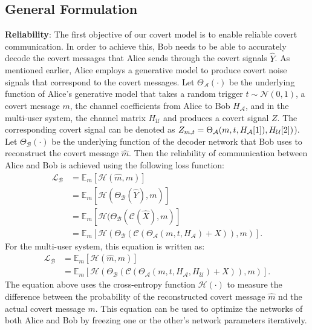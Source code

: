 \subsection{General Formulation}
\textbf{Reliability}: The first objective of our covert model is to enable reliable covert communication. In order to achieve this, Bob needs to be able to accurately decode the covert messages that Alice sends through the covert signals \(\hat{Y}\). As mentioned earlier, Alice employs a generative model to produce covert noise signals that correspond to the covert messages. Let \(\Theta_{\mathcal{A}}(\cdot)\) be the underlying function of Alice's generative model that takes a random trigger \(t \sim \mathcal{N}(0, 1)\), a covert message \(m\), the channel coefficients from Alice to Bob \(H_{\mathcal{A}}\), and in the multi-user system, the channel matrix \(H_{\mathcal{U}}\) and produces a covert signal \(Z\). The corresponding covert signal can be denoted as \(Z_{m, t} = \Theta_{\mathcal{A}}(m, t, H_{\mathcal{A}}[1]), H_{\mathcal{U}}[2])\)). Let  \(\Theta_{\mathcal{B}}(\cdot)\) be the underlying function of the decoder network that Bob uses to reconstruct the covert message \(\hat{m}\). Then the reliability of communication between Alice and Bob is achieved using the following loss function:
\begin{equation}
	\begin{aligned} \label{bob_loss}
	\mathcal{L}_{\mathcal{B}} & = \mathbb{E}_{m}[\mathcal{H}(\hat{m}, m)] \\
	& = \mathbb{E}_{m}[\mathcal{H}(\Theta_{\mathcal{B}}(\hat{Y}), m)] \\ 
	& = \mathbb{E}_{m}[\mathcal{H}(\Theta_{\mathcal{B}}(\mathcal{C}(\hat{X}), m)] \\ 
	& = \mathbb{E}_{m}[\mathcal{H}(\Theta_{\mathcal{B}}(\mathcal{C}(\Theta_{\mathcal{A}}(m, t, H_{\mathcal{A}}) + X)), m)].
	\end{aligned}
\end{equation}
For the multi-user system, this equation is written as:
\begin{equation}
	\begin{aligned}
		\mathcal{L}_{\mathcal{B}} & = \mathbb{E}_{m}[\mathcal{H}(\hat{m}, m)] \\
		& = \mathbb{E}_{m}[\mathcal{H}(\Theta_{\mathcal{B}}(\mathcal{C}(\Theta_{\mathcal{A}}(m, t, H_{\mathcal{A}}, H_{\mathcal{U}}) + X)), m)].
	\end{aligned}
\end{equation}
The equation above uses the cross-entropy function \(\mathcal{H}(\cdot)\) to measure the difference between the probability of the reconstructed covert message \(\hat{m}\) nd the actual covert message \(m\). This equation can be used to optimize the networks of both Alice and Bob by freezing one or the other's network parameters iteratively.

